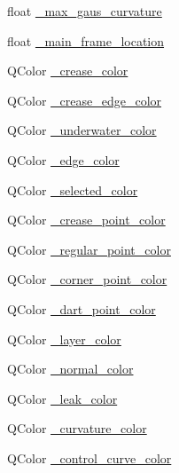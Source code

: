 \begin{DoxyCompactItemize}
\item 
float \hyperlink{classShipCAD_1_1SubdivisionSurface_a1658374385131656d359ff373d2cb08c}{\-\_\-max\-\_\-gaus\-\_\-curvature}
\item 
float \hyperlink{classShipCAD_1_1SubdivisionSurface_a3ea08aa45ad221a1b485010ce5e8dee7}{\-\_\-main\-\_\-frame\-\_\-location}
\item 
Q\-Color \hyperlink{classShipCAD_1_1SubdivisionSurface_aaa3b772931e04f8650db2d005ae05d6a}{\-\_\-crease\-\_\-color}
\item 
Q\-Color \hyperlink{classShipCAD_1_1SubdivisionSurface_a6106aee9d086aa377d9a3a6a6291b54c}{\-\_\-crease\-\_\-edge\-\_\-color}
\item 
Q\-Color \hyperlink{classShipCAD_1_1SubdivisionSurface_a8a64eabb53fa0facaa6e59579305328b}{\-\_\-underwater\-\_\-color}
\item 
Q\-Color \hyperlink{classShipCAD_1_1SubdivisionSurface_aced3b075062f92e55b3a89729cad3fd2}{\-\_\-edge\-\_\-color}
\item 
Q\-Color \hyperlink{classShipCAD_1_1SubdivisionSurface_a3cfcbbe769216c753330f71e57a4cf4d}{\-\_\-selected\-\_\-color}
\item 
Q\-Color \hyperlink{classShipCAD_1_1SubdivisionSurface_a9602182d9a123dc267d34a2cd1b45ed7}{\-\_\-crease\-\_\-point\-\_\-color}
\item 
Q\-Color \hyperlink{classShipCAD_1_1SubdivisionSurface_afee1585e376c34aa9b3be47f3a174cdb}{\-\_\-regular\-\_\-point\-\_\-color}
\item 
Q\-Color \hyperlink{classShipCAD_1_1SubdivisionSurface_aba9fae36ed19b802707c748396c1fd63}{\-\_\-corner\-\_\-point\-\_\-color}
\item 
Q\-Color \hyperlink{classShipCAD_1_1SubdivisionSurface_a45054fd2d0065a342828bcd675e91307}{\-\_\-dart\-\_\-point\-\_\-color}
\item 
Q\-Color \hyperlink{classShipCAD_1_1SubdivisionSurface_a0833012e177dfd6cdb71174cb7baed17}{\-\_\-layer\-\_\-color}
\item 
Q\-Color \hyperlink{classShipCAD_1_1SubdivisionSurface_a62cbe24451a794c0da3660ed0f1066ca}{\-\_\-normal\-\_\-color}
\item 
Q\-Color \hyperlink{classShipCAD_1_1SubdivisionSurface_aacd1616b97a4425cc9b1051e01785596}{\-\_\-leak\-\_\-color}
\item 
Q\-Color \hyperlink{classShipCAD_1_1SubdivisionSurface_a05a83d21996abb065abe7f3109f35a73}{\-\_\-curvature\-\_\-color}
\item 
Q\-Color \hyperlink{classShipCAD_1_1SubdivisionSurface_af0385bc183e805c1adc23750747a43d7}{\-\_\-control\-\_\-curve\-\_\-color}

\end{DoxyCompactItemize}
